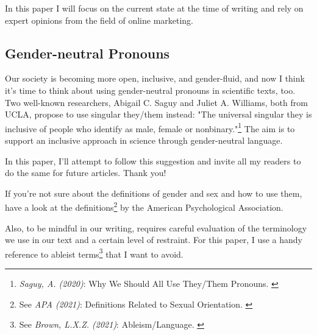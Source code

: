 In this paper I will focus on the current state at the time of writing and rely on expert opinions from the field of online marketing.

\subsection{Gender-neutral Pronouns}

Our society is becoming more open, inclusive, and gender-fluid, and now I think it's time to think about using gender-neutral pronouns in scientific texts, too. Two well-known researchers, Abigail C. Saguy and Juliet A. Williams, both from UCLA, propose to use singular they/them instead: "The universal singular they is inclusive of people who identify as male, female or nonbinary."\footnote{\textit{Saguy, A. (2020)}: Why We Should All Use They/Them Pronouns. \cite{pronouns}} The aim is to support an inclusive approach in science through gender-neutral language. 

In this paper, I'll attempt to follow this suggestion and invite all my readers to do the same for future articles. Thank you!

If you're not sure about the definitions of gender and sex and how to use them, have a look at the definitions\footnote{See \textit{APA (2021)}: Definitions Related to Sexual Orientation. \cite{apaDefinitions}} by the American Psychological Association.

Also, to be mindful in our writing, requires careful evaluation of the terminology we use in our text and a certain level of restraint. For this paper, I use a handy reference to ableist terms\footnote{See \textit{Brown, L.X.Z. (2021)}: Ableism/Language. \cite{ableismLanguage}} that I want to avoid.
